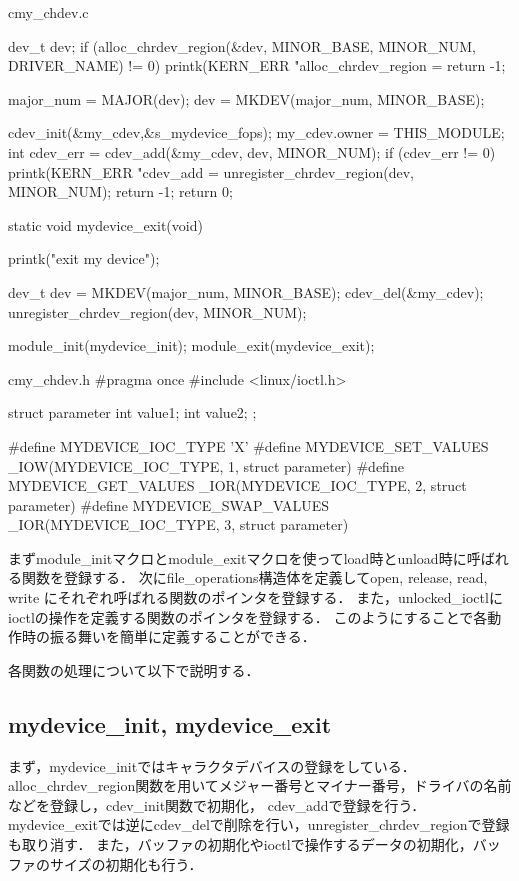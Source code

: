 \begin{longlisting}
\begin{myminted}{c}{my\_chdev.c}
{    dev_t dev;
    if (alloc_chrdev_region(&dev, MINOR_BASE, MINOR_NUM, DRIVER_NAME) != 0) {
        printk(KERN_ERR  "alloc_chrdev_region = %
        return -1;
    }

    major_num = MAJOR(dev);
    dev = MKDEV(major_num, MINOR_BASE);

    cdev_init(&my_cdev,&s_mydevice_fops);
    my_cdev.owner = THIS_MODULE;
    int cdev_err = cdev_add(&my_cdev, dev, MINOR_NUM);
    if (cdev_err != 0) {
        printk(KERN_ERR  "cdev_add = %
        unregister_chrdev_region(dev, MINOR_NUM);
        return -1;
    }
    return 0;
}

static void mydevice_exit(void) {
    printk("exit my device\n");

    dev_t dev = MKDEV(major_num, MINOR_BASE);
    cdev_del(&my_cdev);
    unregister_chrdev_region(dev, MINOR_NUM);
}

module_init(mydevice_init);
module_exit(mydevice_exit);
\end{myminted}
\caption{作成したデバイス・ドライバ}
\label{lst:chdev}
\end{longlisting}


\begin{longlisting}
\begin{myminted}{c}{my\_chdev.h}
#pragma once
#include <linux/ioctl.h>

struct parameter {
    int value1;
    int value2;
};

#define MYDEVICE_IOC_TYPE 'X'
#define MYDEVICE_SET_VALUES _IOW(MYDEVICE_IOC_TYPE, 1, struct parameter)
#define MYDEVICE_GET_VALUES _IOR(MYDEVICE_IOC_TYPE, 2, struct parameter)
#define MYDEVICE_SWAP_VALUES _IOR(MYDEVICE_IOC_TYPE, 3, struct parameter)
\end{myminted}
\caption{my\_chdev.h}
\label{lst:chdevh}
\end{longlisting}

まずmodule\_initマクロとmodule\_exitマクロを使ってload時とunload時に呼ばれる関数を登録する．
次にfile\_operations構造体を定義してopen, release, read, write にそれぞれ呼ばれる関数のポインタを登録する．
また，unlocked\_ioctlにioctlの操作を定義する関数のポインタを登録する．
このようにすることで各動作時の振る舞いを簡単に定義することができる．

各関数の処理について以下で説明する．
\subsection{mydevice\_init, mydevice\_exit}
まず，mydevice\_initではキャラクタデバイスの登録をしている．
alloc\_chrdev\_region関数を用いてメジャー番号とマイナー番号，ドライバの名前などを登録し，cdev\_init関数で初期化，
cdev\_addで登録を行う．
mydevice\_exitでは逆にcdev\_delで削除を行い，unregister\_chrdev\_regionで登録も取り消す．
また，バッファの初期化やioctlで操作するデータの初期化，バッファのサイズの初期化も行う．

